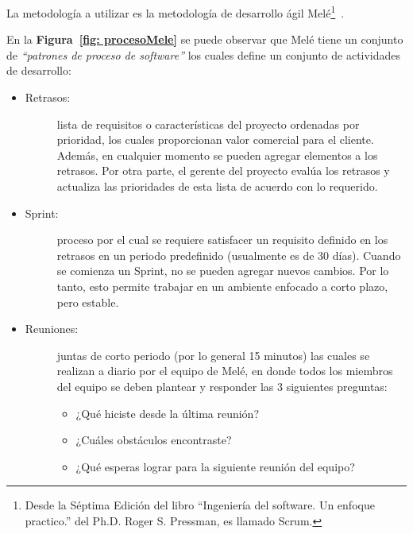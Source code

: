 La metodología a utilizar es la metodología de desarrollo ágil Melé\footnote{Desde la Séptima Edición del libro ``Ingeniería del software. Un enfoque practico.'' del Ph.D. Roger S. Pressman, es llamado Scrum. }~\cite{7}.

En la \textbf{Figura~\ref{fig: procesoMele}} se puede observar que Melé tiene un conjunto de \emph{``patrones de proceso de software''} los cuales define un conjunto de actividades de desarrollo:

\begin{itemize}
    \item   \begin{description}
                \item[Retrasos:] lista de requisitos o características del proyecto ordenadas por prioridad, los cuales proporcionan valor comercial para el cliente. Además, en cualquier momento se pueden agregar elementos a los retrasos. Por otra parte, el gerente del proyecto evalúa los retrasos y actualiza las prioridades de esta lista de acuerdo con lo requerido. 
            \end{description}

    \item   \begin{description}
                \item[Sprint:] proceso por el cual se requiere satisfacer un requisito definido en los retrasos en un periodo predefinido (usualmente es de 30 días). Cuando se comienza un Sprint, no se pueden agregar nuevos cambios. Por lo tanto, esto permite trabajar en un ambiente enfocado a corto plazo, pero estable.
            \end{description}

    \item   \begin{description}
                \item[Reuniones:] juntas de corto periodo (por lo general 15 minutos) las cuales se realizan a diario por el equipo de Melé, en donde todos los miembros del equipo se deben plantear y responder las 3 siguientes preguntas: 
% 
                \begin{itemize}
                    \item ¿Qué hiciste desde la última reunión?

                    \item ¿Cuáles obstáculos encontraste? 

                    \item ¿Qué esperas lograr para la siguiente reunión del equipo?
                \end{itemize}


\end{description}
\end{itemize}
